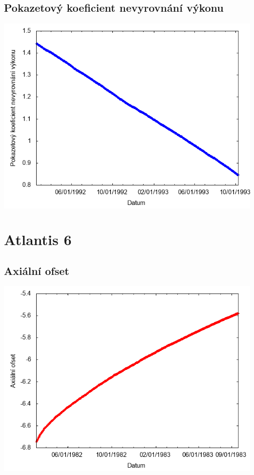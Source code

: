 \documentclass[a4paper,twoside,11pt]{article}
\begin{document}
\subsection*{Pokazetový koeficient nevyrovnání výkonu}
\begin{center}
\includegraphics[width=.8\textwidth]{graphs/Atlantis_05_fha.png}
\end{center}

\newpage
\section*{Atlantis 6}
\subsection*{Axiální ofset}
\begin{center}
\includegraphics[width=.8\textwidth]{graphs/Atlantis_06_ao.png}
\end{center}
\end{document}

